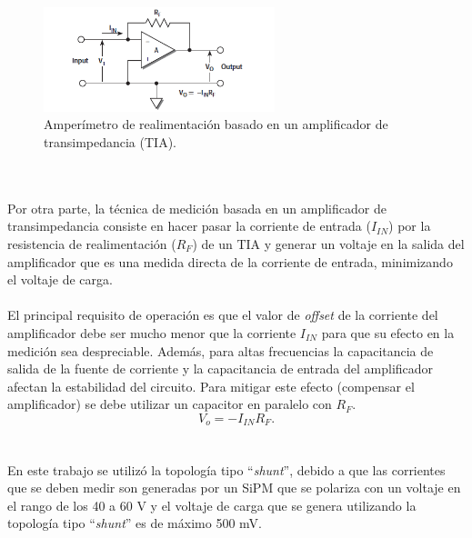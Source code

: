 \begin{figure}[h!]
\begin{centering}
  \includegraphics[width=0.6\textwidth]{Images/feedback.png}
    \caption{Amperímetro de realimentación basado en un amplificador de transimpedancia  (TIA). }
    \label{fig:feedback_circuit}
  \par\end{centering}
\end{figure}
\\ \\
Por otra parte, la técnica de medición basada en un amplificador de transimpedancia consiste en hacer pasar la corriente de entrada ($I_{IN}$) por la resistencia de realimentación ($R_F$) de un TIA y generar un voltaje en la salida del amplificador que es una medida directa de la corriente de entrada, minimizando el voltaje de carga. \\ \\
El principal requisito de operación es que el valor de \textit{offset} de la corriente del amplificador debe ser mucho menor que la corriente $I_{IN}$ para que su efecto en la medición sea despreciable. Además, para altas frecuencias la capacitancia de salida de la fuente de corriente y la capacitancia de entrada del amplificador afectan la estabilidad del circuito. Para mitigar este efecto (compensar el amplificador) se debe utilizar un capacitor en paralelo con $R_F$.    
\begin{equation}
    V_o= -I_{IN} R_F.
\end{equation}{}
\\ \\
En este trabajo se utilizó la topología tipo ``\textit{shunt}'', debido a que las corrientes que se deben medir son generadas por un SiPM que  se polariza con un voltaje en el rango de los 40 a 60 V y el voltaje de carga que se genera utilizando la topología tipo ``\textit{shunt}'' es de máximo 500 mV.%
